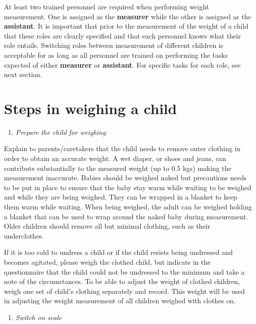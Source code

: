 \documentclass[
  12pt,
]{book}
\providecommand{\tightlist}{%
  \setlength{\itemsep}{0pt}\setlength{\parskip}{0pt}}
\begin{document}
At least two trained personnel are required when performing weight measurement. One is assigned as the \textbf{measurer} while the other is assigned as the \textbf{assistant}. It is important that prior to the measurement of the weight of a child that these roles are clearly specified and that each personnel knows what their role entails. Switching roles between measurement of different children is acceptable for as long as all personnel are trained on performing the tasks expected of either \textbf{measurer} or \textbf{assistant}. For specific tasks for each role, see next section.

\hypertarget{steps-in-weighing-a-child}{%
\section{Steps in weighing a child}\label{steps-in-weighing-a-child}}

\begin{enumerate}
\def\labelenumi{\arabic{enumi}.}
\tightlist
\item
  \emph{Prepare the child for weighing}
\end{enumerate}

Explain to parents/caretakers that the child needs to remove outer clothing in order to obtain an accurate weight. A wet diaper, or shoes and jeans, can contribute substantially to the measured weight (up to 0.5 kgs) making the measurement inaccurate. Babies should be weighed naked but precautions needs to be put in place to ensure that the baby stay warm while waiting to be weighed and while they are being weighed. They can be wrapped in a blanket to keep them warm while waiting. When being weighed, the adult can be weighed holding a blanket that can be used to wrap around the naked baby during measurement. Older children should remove all but minimal clothing, such as their underclothes.

If it is too cold to undress a child or if the child resists being undressed and becomes agitated, please weigh the clothed child, but indicate in the questionnaire that the child could not be undressed to the minimum and take a note of the circumstances. To be able to adjust the weight of clothed children, weigh one set of child's clothing separately and record. This weight will be used in adjusting the weight measurement of all children weighed with clothes on.

\begin{enumerate}
\def\labelenumi{\arabic{enumi}.}
\setcounter{enumi}{1}
\tightlist
\item
  \emph{Switch on scale}
\end{enumerate}
\end{document}
